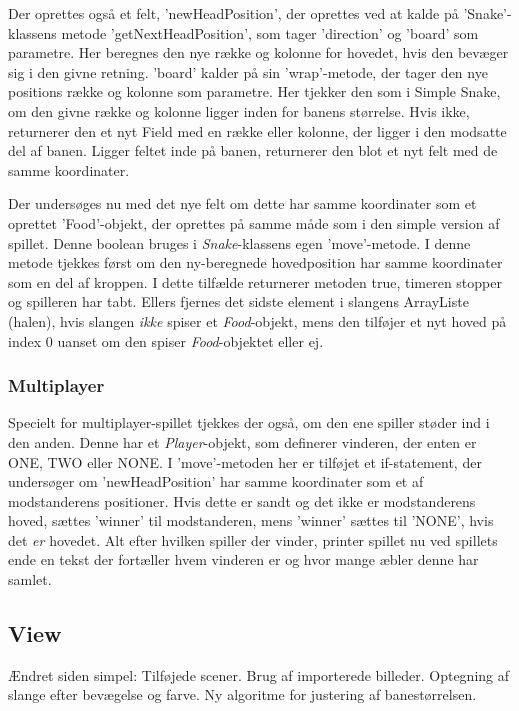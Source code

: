 Der oprettes også et felt, 'newHeadPosition', der oprettes ved at kalde på 'Snake'-klassens metode 'getNextHeadPosition', som tager 'direction' og 'board' som parametre. Her beregnes den nye række og kolonne for hovedet, hvis den bevæger sig i den givne retning. 'board' kalder på sin 'wrap'-metode, der tager den nye positions række og kolonne som parametre. Her tjekker den som i Simple Snake, om den givne række og kolonne ligger inden for banens størrelse. Hvis ikke, returnerer den et nyt Field med en række eller kolonne, der ligger i den modsatte del af banen. Ligger feltet inde på banen, returnerer den blot et nyt felt med de samme koordinater.
\newline

Der undersøges nu med det nye felt om dette har samme koordinater som et oprettet 'Food'-objekt, der oprettes på samme måde som i den simple version af spillet. Denne boolean bruges i \textit{Snake}-klassens egen 'move'-metode. I denne metode tjekkes først om den ny-beregnede hovedposition har samme koordinater som en del af kroppen. I dette tilfælde returnerer metoden true, timeren stopper og spilleren har tabt. Ellers fjernes det sidste element i slangens ArrayListe (halen), hvis slangen \textit{ikke} spiser et \textit{Food}-objekt, mens den tilføjer et nyt hoved på index 0 uanset om den spiser \textit{Food}-objektet eller ej.
\newline
   
\subsubsection{Multiplayer}
Specielt for multiplayer-spillet tjekkes der også, om den ene spiller støder ind i den anden. Denne har et \textit{Player}-objekt, som definerer vinderen, der enten er ONE, TWO eller NONE. I 'move'-metoden her er tilføjet et if-statement, der undersøger om 'newHeadPosition' har samme koordinater som et af modstanderens positioner. Hvis dette er sandt og det ikke er modstanderens hoved, sættes 'winner' til modstanderen, mens 'winner' sættes til 'NONE', hvis det \textit{er} hovedet.
Alt efter hvilken spiller der vinder, printer spillet nu ved spillets ende en tekst der fortæller hvem vinderen er og hvor mange æbler denne har samlet.


\subsection{View}
Ændret siden simpel: Tilføjede scener. Brug af importerede billeder. Optegning af slange efter bevægelse og farve. Ny algoritme for justering af banestørrelsen.
\newline

